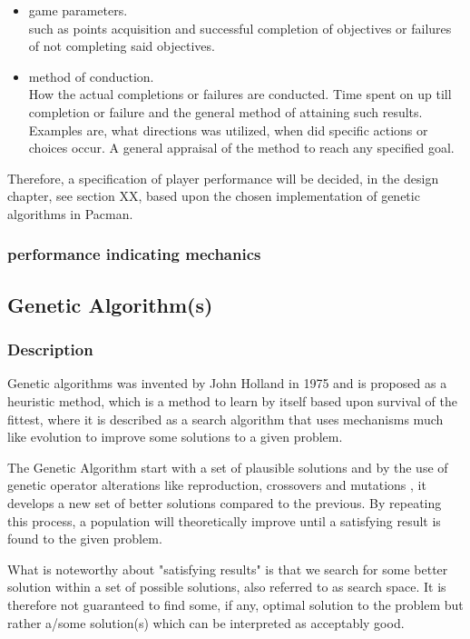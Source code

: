 \begin{itemize}
\item game parameters.\\
such as points acquisition and successful completion of objectives or failures of not completing said objectives.
\item method of conduction.\\
How the actual completions or failures are conducted. Time spent on up till completion or failure and the general method of attaining such results. Examples are, what directions was utilized, when did specific actions or choices occur. A general appraisal of the method to reach any specified goal.
\end{itemize}

Therefore, a specification of player performance will be decided, in the design chapter, see section XX, based upon the chosen implementation of genetic algorithms in Pacman.

\subsubsection{performance indicating mechanics}



\subsection{Genetic Algorithm(s)}

\subsubsection{Description}
Genetic algorithms was invented by John Holland in 1975 and is proposed as a heuristic method, which is a method to learn by itself based upon survival of the fittest, where it is described as a  search algorithm that uses mechanisms much like evolution to improve some solutions to a given problem. \cite[pp. 20]{Sivanandam2008}

The Genetic Algorithm start with a set of plausible solutions and by the use of genetic operator alterations like reproduction, crossovers and mutations \cite{Baltzer2014}, it develops a new set of better solutions compared to the previous. By repeating this process, a population will theoretically improve until a satisfying result is found to the given problem. \cite{BCS2013}

What is noteworthy about "satisfying results" is that we search for some better solution within a set of possible solutions, also referred to as search space. It is therefore not guaranteed to find some, if any, optimal solution to the problem but rather a/some solution(s) which can be interpreted as acceptably good. \cite[pp. 20/21]{Sivanandam2008}


